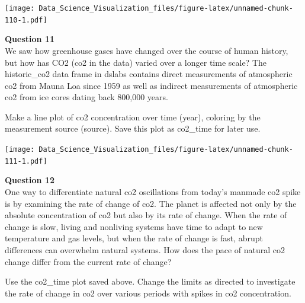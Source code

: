 \documentclass[
]{article}
\newenvironment{Shaded}{\begin{snugshade}}{\end{snugshade}}
\newcommand{\DataTypeTok}[1]{\textcolor[rgb]{0.13,0.29,0.53}{#1}}
\newcommand{\KeywordTok}[1]{\textcolor[rgb]{0.13,0.29,0.53}{\textbf{#1}}}
\newcommand{\NormalTok}[1]{#1}
\newcommand{\OperatorTok}[1]{\textcolor[rgb]{0.81,0.36,0.00}{\textbf{#1}}}
\newcommand{\StringTok}[1]{\textcolor[rgb]{0.31,0.60,0.02}{#1}}
\begin{document}
\begin{Shaded}
\end{Shaded}

\texttt{[image: Data\_Science\_Visualization\_files/figure-latex/unnamed-chunk-110-1.pdf]}

\textbf{Question 11}\\
We saw how greenhouse gases have changed over the course of human
history, but how has CO2 (co2 in the data) varied over a longer time
scale? The historic\_co2 data frame in dslabs contains direct
measurements of atmospheric co2 from Mauna Loa since 1959 as well as
indirect measurements of atmospheric co2 from ice cores dating back
800,000 years.

Make a line plot of co2 concentration over time (year), coloring by the
measurement source (source). Save this plot as co2\_time for later use.

\begin{Shaded}
\end{Shaded}

\texttt{[image: Data\_Science\_Visualization\_files/figure-latex/unnamed-chunk-111-1.pdf]}

\textbf{Question 12}\\
One way to differentiate natural co2 oscillations from today's manmade
co2 spike is by examining the rate of change of co2. The planet is
affected not only by the absolute concentration of co2 but also by its
rate of change. When the rate of change is slow, living and nonliving
systems have time to adapt to new temperature and gas levels, but when
the rate of change is fast, abrupt differences can overwhelm natural
systems. How does the pace of natural co2 change differ from the current
rate of change?

Use the co2\_time plot saved above. Change the limits as directed to
investigate the rate of change in co2 over various periods with spikes
in co2 concentration.
\end{document}
